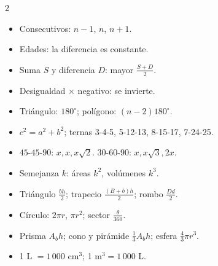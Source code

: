 \begin{multicols}{2}
\columnbreak
{}
\begin{itemize}
  \item Consecutivos: $n - 1$, $n$, $n + 1$.
  \item Edades: la diferencia es constante.
  \item Suma $S$ y diferencia $D$: mayor $\tfrac{S + D}{2}$.
  \item Desigualdad $\times$ negativo: se invierte.
\end{itemize}

\begin{itemize}
  \item Triángulo: $180^\circ$; polígono: $(n - 2)180^\circ$.
  \item $c^2 = a^2 + b^2$; ternas 3-4-5, 5-12-13, 8-15-17, 7-24-25.
  \item $45$-$45$-$90$: $x, x, x\sqrt2$. $30$-$60$-$90$: $x, x\sqrt3, 2x$.
  \item Semejanza $k$: áreas $k^2$, volúmenes $k^3$.
  \item Triángulo $\tfrac{bh}{2}$; trapecio $\tfrac{(B + b)h}{2}$; rombo $\tfrac{Dd}{2}$.
  \item Círculo: $2\pi r$, $\pi r^2$; sector $\tfrac{\theta}{360}$.
  \item Prisma $A_b h$; cono y pirámide $\tfrac13 A_b h$; esfera $\tfrac43 \pi r^3$.
  \item 1 L $= 1\,000$ cm$^3$; 1 m$^3 = 1\,000$ L.
\end{itemize}
\end{multicols}

